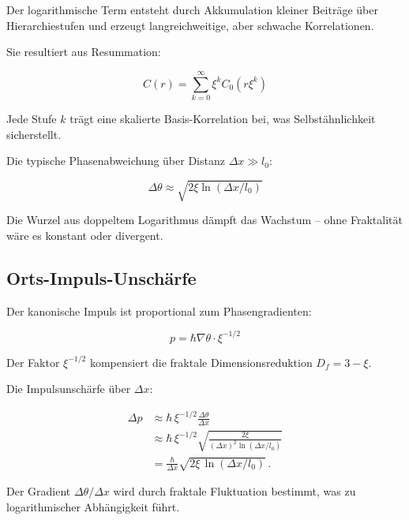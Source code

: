 	Der logarithmische Term entsteht durch Akkumulation kleiner Beiträge über Hierarchiestufen und erzeugt langreichweitige, aber schwache Korrelationen.
	
	Sie resultiert aus Resummation:
	
	\begin{equation}
		C(r) = \sum_{k=0}^\infty \xi^k C_0(r \xi^k)
	\end{equation}
	
	Jede Stufe \(k\) trägt eine skalierte Basis-Korrelation bei, was Selbstähnlichkeit sicherstellt.
	
	Die typische Phasenabweichung über Distanz \(\Delta x \gg l_0\):
	
	\begin{equation}
		\Delta \theta \approx \sqrt{2 \xi \ln(\Delta x / l_0)}
	\end{equation}
	
	Die Wurzel aus doppeltem Logarithmus dämpft das Wachstum – ohne Fraktalität wäre es konstant oder divergent.
	
	\subsection*{Orts-Impuls-Unschärfe}
	
	Der kanonische Impuls ist proportional zum Phasengradienten:
	
	\begin{equation}
		p = \hbar \nabla \theta \cdot \xi^{-1/2}
	\end{equation}
	
	Der Faktor \(\xi^{-1/2}\) kompensiert die fraktale Dimensionsreduktion \(D_f = 3 - \xi\).
	
	Die Impulsunschärfe über \(\Delta x\):
	
     \begin{equation}
	\begin{aligned}
		\Delta p
		&\approx \hbar \,\xi^{-1/2} \frac{\Delta \theta}{\Delta x} \\
		&\approx \hbar \,\xi^{-1/2}
		\sqrt{
			\frac{2 \xi}{
				(\Delta x)^2 \ln(\Delta x / l_0)
			}
		} \\
		&= \frac{\hbar}{\Delta x}
		\sqrt{
			2 \xi \,\ln(\Delta x / l_0)
		} \, .
	\end{aligned}
\end{equation}
	
	Der Gradient \(\Delta \theta / \Delta x\) wird durch fraktale Fluktuation bestimmt, was zu logarithmischer Abhängigkeit führt.
	
